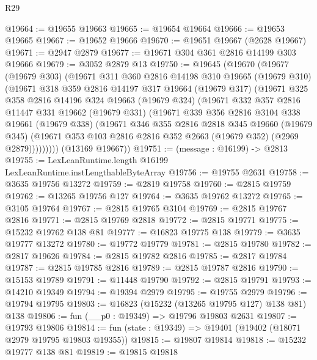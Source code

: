 \begin{lexlean}{R29}
\begin{coremodule}
@19664 := @19655 @19663
@19665 := @19654 @19664
@19666 := @19653 @19665
@19667 := @19652 @19666
@19670 := @19651 @19667 (@2628 @19667)
@19671 := @2947 @2879
@19677 := @19671 @304 @361 @2816 @14199 @303 @19666
@19679 := @3052 @2879 @13
@19750 := @19645
    (@19670
      (@19677
        (@19679 @303)
        (@19671
          @311
          @360
          @2816
          @14198
          @310
          @19665
          (@19679 @310)
          (@19671
            @318
            @359
            @2816
            @14197
            @317
            @19664
            (@19679 @317)
            (@19671
              @325
              @358
              @2816
              @14196
              @324
              @19663
              (@19679 @324)
              (@19671
                @332
                @357
                @2816
                @11447
                @331
                @19662
                (@19679 @331)
                (@19671
                  @339
                  @356
                  @2816
                  @3104
                  @338
                  @19661
                  (@19679 @338)
                  (@19671
                    @346
                    @355
                    @2816
                    @2818
                    @345
                    @19660
                    (@19679 @345)
                    (@19671 @353 @103 @2816 @2816 @352 @2663 (@19679 @352) (@2969 @2879)))))))))
      (@13169 @19667))
@19751 := (message : @16199) -> @2813
@19755 := LexLeanRuntime.length @16199 LexLeanRuntime.instLengthableByteArray
@19756 := @19755 @2631
@19758 := @3635 @19756 @13272
@19759 := @2819 @19758
@19760 := @2815 @19759
@19762 := @13265 @19756 @127
@19764 := @3635 @19762 @13272
@19765 := @3105 @19764
@19767 := @2815 @19765 @3104
@19769 := @2815 @19767 @2816
@19771 := @2815 @19769 @2818
@19772 := @2815 @19771
@19775 := @15232 @19762 @138 @81
@19777 := @16823 @19775 @138
@19779 := @3635 @19777 @13272
@19780 := @19772 @19779
@19781 := @2815 @19780
@19782 := @2817 @19626
@19784 := @2815 @19782 @2816
@19785 := @2817 @19784
@19787 := @2815 @19785 @2816
@19789 := @2815 @19787 @2816
@19790 := @15153 @19789
@19791 := @11448 @19790
@19792 := @2815 @19791
@19793 := @14210 @19349
@19794 := @19394 @2979
@19795 := @19755 @2979
@19796 := @19794 @19795
@19803 := @16823 (@15232 (@13265 @19795 @127) @138 @81) @138
@19806 := fun (__p0 : @19349) => @19796 @19803 @2631
@19807 := @19793 @19806
@19814 := fun (state : @19349) => @19401 (@19402 (@18071 @2979 @19795 @19803 @19355))
@19815 := @19807 @19814
@19818 := @15232 @19777 @138 @81
@19819 := @19815 @19818

\end{coremodule}
\end{lexlean}
